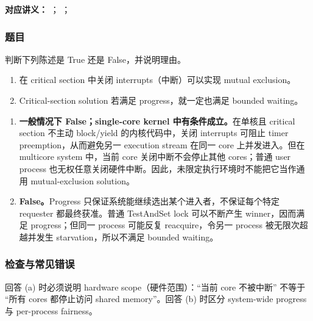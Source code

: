 
\textbf{对应讲义：}
；
；

\subsubsection*{题目}

判断下列陈述是 True 还是 False，并说明理由。

\begin{enumerate}[label=(\alph*)]
  \item 在 critical section 中关闭 interrupts（中断）可以实现 mutual exclusion。
  \item Critical-section solution 若满足 progress，就一定也满足 bounded waiting。
\end{enumerate}

\begin{checkedsolution}
\begin{enumerate}[label=(\alph*)]
  \item \textbf{一般情况下 False；single-core kernel 中有条件成立。}在单核且 critical section 不主动 block/yield 的内核代码中，关闭 interrupts 可阻止 timer preemption，从而避免另一 execution stream 在同一 core 上并发进入。但在 multicore system 中，当前 core 关闭中断不会停止其他 cores；普通 user process 也无权任意关闭硬件中断。因此，未限定执行环境时不能把它当作通用 mutual-exclusion solution。
  \item \textbf{False。}Progress 只保证系统能继续选出某个进入者，不保证每个特定 requester 都最终获准。普通 TestAndSet lock 可以不断产生 winner，因而满足 progress；但同一 process 可能反复 reacquire，令另一 process 被无限次超越并发生 starvation，所以不满足 bounded waiting。
\end{enumerate}
\end{checkedsolution}

\subsubsection*{检查与常见错误}

回答 (a) 时必须说明 hardware scope（硬件范围）：``当前 core 不被中断'' 不等于 ``所有 cores 都停止访问 shared memory''。回答 (b) 时区分 system-wide progress 与 per-process fairness。

